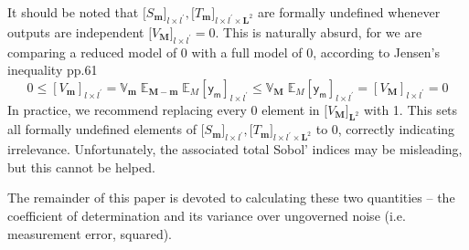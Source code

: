 \documentclass[preprint,12pt]{elsarticle}
\newcommand*{\x}{\times}
\newcommand*{\mi}[1]{\mathbf{#1}}
\newcommand*{\rv}[1]{\mathsf{#1}}
\newcommand*{\te}[2][]{\left\lbrack{#2}\right\rbrack_{#1}}
\newcommand*{\tte}[2][]{\lbrack{#2}\rbrack_{#1}}
\newcommand*{\evt}[3][]{\mathbb{E}_{#3}^{#1}\!#2}
\newcommand*{\covt}[2]{\mathbb{V}_{#2}\!{#1}}
\begin{document}
    It should be noted that $\tte[l\x l^{\prime}]{S_{\mi{m}}},\tte[l\x l^{\prime}\x\mi{L}^{2}]{T_{\mi{m}}}$ are formally undefined whenever outputs are independent $\tte[l\x l^{\prime}]{V_{\mi{M}}} = 0$. This is naturally absurd, for we are comparing a reduced model of $0$ with a full model of $0$, according to Jensen's inequality \cite{Williams1991} pp.61
    \begin{equation*}
        0 \leq \te[l\x l^{\prime}]{V_{\mi{m}}} = \covt{\;\evt{\; \evt{\te[l\x l^{\prime}]{\rv{y_m}}}{M}}{\mi{M-m}}}{\mi{m}}
        \leq \covt{\;\evt{\te[l\x l^{\prime}]{\rv{y_m}}}{M}}{\mi{M}} =  \te[l\x l^{\prime}]{V_{\mi{M}}} = 0
    \end{equation*}
    In practice, we recommend replacing every $0$ element in $\tte[\mi{L}^{2}]{V_{\mi{M}}}$ with 1. This sets all formally undefined elements of $\tte[l\x l^{\prime}]{S_{\mi{m}}},\tte[l\x l^{\prime}\x\mi{L}^{2}]{T_{\mi{m}}}$ to $0$, correctly indicating irrelevance. Unfortunately, the associated total Sobol' indices may be misleading, but this cannot be helped.

    The remainder of this paper is devoted to calculating these two quantities -- the coefficient of determination and its variance over ungoverned noise (i.e. measurement error, squared).
\end{document}
